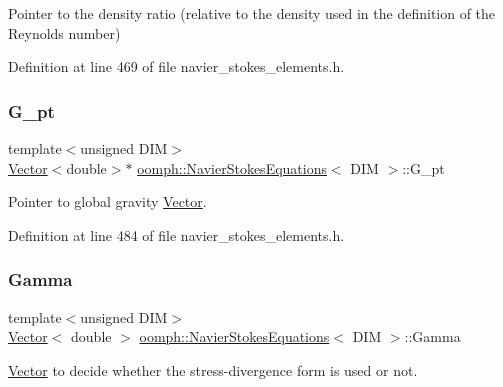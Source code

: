 Pointer to the density ratio (relative to the density used in the definition of the Reynolds number) 



Definition at line 469 of file navier\+\_\+stokes\+\_\+elements.\+h.

\mbox{\label{classoomph_1_1NavierStokesEquations_aa5ace66d6342862c6d6f4df4862acd0c}} 
\subsubsection{\texorpdfstring{G\+\_\+pt}{G\_pt}}
{\footnotesize\ttfamily template$<$unsigned D\+IM$>$ \\
\hyperlink{classoomph_1_1Vector}{Vector}$<$double$>$$\ast$ \hyperlink{classoomph_1_1NavierStokesEquations}{oomph\+::\+Navier\+Stokes\+Equations}$<$ D\+IM $>$\+::G\+\_\+pt\hspace{0.3cm}{\ttfamily [protected]}}



Pointer to global gravity \hyperlink{classoomph_1_1Vector}{Vector}. 



Definition at line 484 of file navier\+\_\+stokes\+\_\+elements.\+h.

\mbox{\label{classoomph_1_1NavierStokesEquations_aff5d91438414b0c5f6ab117a84d6749a}} 
\subsubsection{\texorpdfstring{Gamma}{Gamma}}
{\footnotesize\ttfamily template$<$unsigned D\+IM$>$ \\
\hyperlink{classoomph_1_1Vector}{Vector}$<$ double $>$ \hyperlink{classoomph_1_1NavierStokesEquations}{oomph\+::\+Navier\+Stokes\+Equations}$<$ D\+IM $>$\+::Gamma\hspace{0.3cm}{\ttfamily [static]}}



\hyperlink{classoomph_1_1Vector}{Vector} to decide whether the stress-\/divergence form is used or not. 

